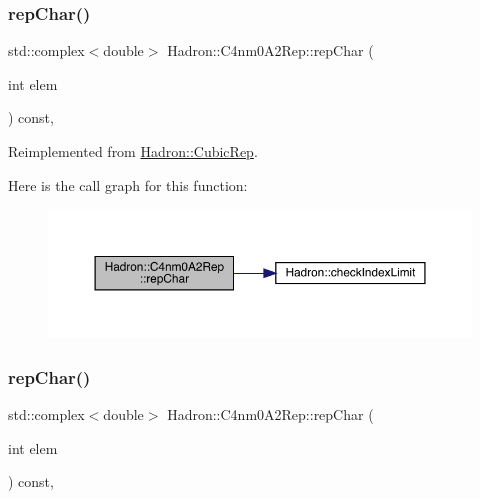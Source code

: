 \subsubsection{\texorpdfstring{repChar()}{repChar()}\hspace{0.1cm}{\footnotesize\ttfamily [2/3]}}
{\footnotesize\ttfamily std\+::complex$<$double$>$ Hadron\+::\+C4nm0\+A2\+Rep\+::rep\+Char (\begin{DoxyParamCaption}\item[{int}]{elem }\end{DoxyParamCaption}) const\hspace{0.3cm}{\ttfamily [inline]}, {\ttfamily [virtual]}}



Reimplemented from \mbox{\hyperlink{structHadron_1_1CubicRep_af45227106e8e715e84b0af69cd3b36f8}{Hadron\+::\+Cubic\+Rep}}.

Here is the call graph for this function\+:
\nopagebreak
\begin{figure}[H]
\begin{center}
\leavevmode
\includegraphics[width=350pt]{d2/db9/structHadron_1_1C4nm0A2Rep_ad4d1ed2c8ee991654f7c1369f487a810_cgraph}
\end{center}
\end{figure}
\mbox{\label{structHadron_1_1C4nm0A2Rep_ad4d1ed2c8ee991654f7c1369f487a810}} 
\subsubsection{\texorpdfstring{repChar()}{repChar()}\hspace{0.1cm}{\footnotesize\ttfamily [3/3]}}
{\footnotesize\ttfamily std\+::complex$<$double$>$ Hadron\+::\+C4nm0\+A2\+Rep\+::rep\+Char (\begin{DoxyParamCaption}\item[{int}]{elem }\end{DoxyParamCaption}) const\hspace{0.3cm}{\ttfamily [inline]}, {\ttfamily [virtual]}}



